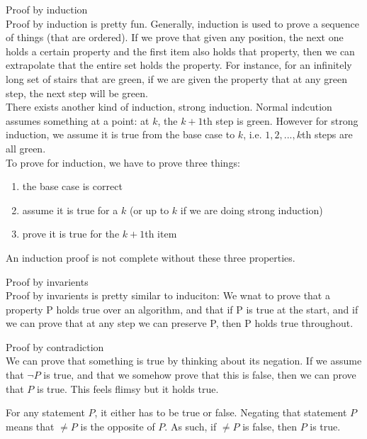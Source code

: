 \documentclass[journal, letterpaper]{IEEEtran}
\begin{document}
\begin{theory}{Proof by induction}\\
    Proof by induction is pretty fun. Generally, induction is used to prove a sequence of
    things (that are ordered). If we prove that given any position, the next one holds a
    certain property and the first item also holds that property, then we can extrapolate
    that the entire set holds the property. For instance, for an infinitely long set of
    stairs that are green, if we are given the property that at any green step, the next
    step will be green. \\

    There exists another kind of induction, strong induction. Normal indcution assumes
    something at a point: at $k$, the $k+1$th step is green. However for strong induction,
    we assume it is true from the base case to $k$, i.e. $1, 2, ..., k$th steps are
    all green. \\

    To prove for induction, we have to prove three things:
    \begin{enumerate}
        \item the base case is correct
        \item assume it is true for a $k$ (or up to $k$ if we are doing strong induction)
        \item prove it is true for the $k+1$th item
    \end{enumerate}
    An induction proof is not complete without these three properties.
\end{theory}

\begin{theory}{Proof by invarients}\\
    Proof by invarients is pretty similar to induciton: We wnat to prove that a property P
    holds true over an algorithm, and that if P is true at the start, and if we can prove
    that at any step we can preserve P, then P holds true throughout.
\end{theory}

\begin{theory}{Proof by contradiction}\\
    We can prove that something is true by thinking about its negation. If we assume that
    $\neg P$ is true, and that we somehow prove that this is false, then we can prove that
    $P$ is true. This feels flimsy but it holds true. 

    For any statement $P$, it either has to be true or false. Negating that statement $P$ means
    that $\neq P$ is the opposite of $P$. As such, if $\neq P$ is false, then $P$ is true.
\end{theory}
\end{document}
